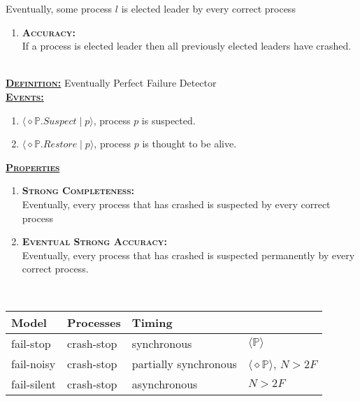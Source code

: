 \documentclass{article}
\begin{document}
\begin{adjustwidth}{2em}{2em}
\begin{adjustwidth}{2em}{2em}
			Eventually, some process $l$ is elected leader by every correct process
			\begin{enumerate}[]
				\item \textbf{\textsc{Accuracy:}} \\
				If a process is elected leader then all previously elected leaders have crashed.
			\end{enumerate}
			\hfill \\
			\underline{\textbf{\textsc{Definition:}}} Eventually Perfect Failure Detector \\
			\underline{\textbf{\textsc{Events:}}} 
			\begin{enumerate}[]
				\item $\langle \diamond \mathbb{P}.\textit{Suspect} \mid p \rangle$, process $p$ is suspected.
				\item $\langle \diamond \mathbb{P}.\textit{Restore} \mid p \rangle$, process $p$ is thought to be alive.
			\end{enumerate}
			\underline{\textbf{\textsc{Properties}}}
			\begin{enumerate}[]
				\item \textbf{\textsc{Strong Completeness:}} \\
				Eventually, every process that has crashed is suspected by every correct process
				\item \textbf{\textsc{Eventual Strong Accuracy:}} \\
				Eventually, every process that has crashed is suspected permanently by every correct process.
			\end{enumerate}
			\hfill \\
			\begin{center}
				\begin{tabular}{|l|l|l|l|}
					\hline
					Model & Processes & Timing & \\
					\hline
					fail-stop & crash-stop & synchronous & $\langle \mathbb{P} \rangle$ \\
					fail-noisy & crash-stop & partially synchronous & $\langle \diamond\mathbb{P} \rangle$, $N > 2F$ \\
					fail-silent & crash-stop & asynchronous & $N > 2F$ \\
					\hline
				\end{tabular}
			\end{center}
		\end{adjustwidth}
	\end{adjustwidth}
	
	\newpage
	
\end{document}
